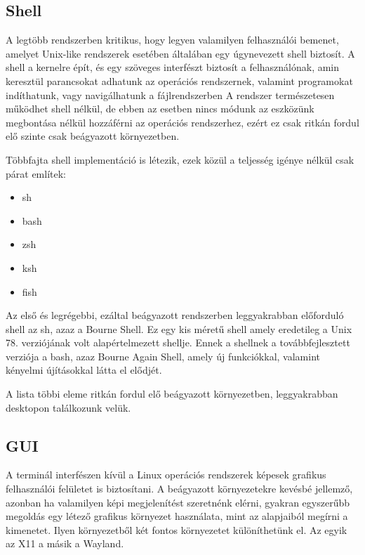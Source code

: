 \subsection{Shell}

A legtöbb rendszerben kritikus, hogy legyen valamilyen felhasználói bemenet, amelyet Unix-like rendszerek esetében általában egy úgynevezett shell biztosít. A shell a kernelre épít, és egy szöveges interfészt biztosít a
felhasználónak, amin keresztül parancsokat adhatunk az operációs rendszernek, valamint programokat indíthatunk, vagy navigálhatunk a fájlrendszerben A rendszer természetesen működhet shell nélkül, de ebben az esetben nincs
módunk az eszközünk megbontása nélkül hozzáférni az operációs rendszerhez, ezért ez csak ritkán fordul elő szinte csak beágyazott környezetben.

Többfajta shell implementáció is létezik, ezek közül a teljesség igénye nélkül csak párat említek:

\begin{itemize}
\item sh
\item bash
\item zsh
\item ksh
\item fish
\end{itemize}

Az első és legrégebbi, ezáltal beágyazott rendszerben leggyakrabban előforduló shell az sh, azaz a Bourne Shell. Ez egy kis méretű shell amely eredetileg a Unix 78. verziójának volt alapértelmezett shellje. Ennek a
shellnek a továbbfejlesztett verziója a bash, azaz Bourne Again Shell, amely új funkciókkal, valamint kényelmi újításokkal látta el elődjét.

A lista többi eleme ritkán fordul elő beágyazott környezetben, leggyakrabban desktopon találkozunk velük. 

\subsection{GUI}

A terminál interfészen kívül a Linux operációs rendszerek képesek grafikus felhasználói felületet is biztosítani. A beágyazott környezetekre kevésbé jellemző, azonban ha valamilyen képi megjelenítést szeretnénk elérni,
gyakran egyszerűbb megoldás egy létező grafikus környezet használata, mint az alapjaiból megírni a kimenetet. Ilyen környezetből két fontos környezetet különíthetünk el. Az egyik az X11 a másik a Wayland.

